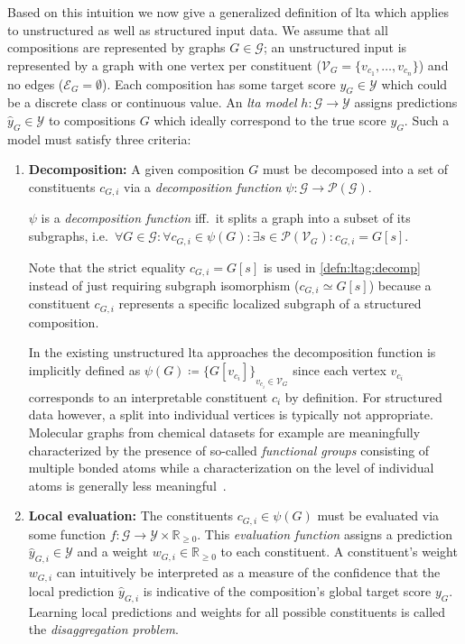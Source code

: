 Based on this intuition we now give a generalized definition of \ac{lta} which applies to unstructured as well as structured input data.
We assume that all compositions are represented by graphs $G \in \mathcal{G}$;
an unstructured input is represented by a graph with one vertex per constituent ($\mathcal{V}_G = \{ v_{c_1}, \dots, v_{c_n} \}$) and no edges ($\mathcal{E}_G = \emptyset$).
Each composition has some target score $y_G \in \mathcal{Y}$ which could be a discrete class or continuous value.
An \textit{\ac{lta} model} $h: \mathcal{G} \to \mathcal{Y}$ assigns predictions $\hat{y}_G \in \mathcal{Y}$ to compositions $G$ which ideally correspond to the true score $y_G$.
Such a model must satisfy three criteria:
\begin{enumerate}[label=\textbf{\arabic*.}]
	\item \textbf{Decomposition:}
		A given composition $G$ must be decomposed into a set of constituents $c_{G,i}$ via a \textit{decomposition function} $\psi: \mathcal{G} \to \mathcal{P}(\mathcal{G})$.
		\begin{defn}\label{defn:ltag:decomp}
			$\psi$ is a \textit{decomposition function} iff.\ it splits a graph into a subset of its subgraphs, i.e.\ $\forall G \in \mathcal{G}: \forall c_{G,i} \in \psi(G): \exists s \in \mathcal{P}(\mathcal{V}_G): c_{G,i} = G[s]$.
		\end{defn}
		Note that the strict equality $c_{G,i} = G[s]$ is used in \cref{defn:ltag:decomp} instead of just requiring subgraph isomorphism ($c_{G,i} \simeq G[s]$) because a constituent $c_{G,i}$ represents a specific localized subgraph of a structured composition.

		In the existing unstructured \ac{lta} approaches the decomposition function is implicitly defined as $\psi(G) \coloneqq {\{ G[v_{c_i}] \}}_{v_{c_i} \in \mathcal{V}_G}$ since each vertex $v_{c_i}$ corresponds to an interpretable constituent $c_i$ by definition.
		For structured data however, a split into individual vertices is typically not appropriate.
		Molecular graphs from chemical datasets for example are meaningfully characterized by the presence of so-called \textit{functional groups} consisting of multiple bonded atoms while a characterization on the level of individual atoms is generally less meaningful~\cite{McNaught1997}.
	\item \textbf{Local evaluation:}
		The constituents $c_{G, i} \in \psi(G)$ must be evaluated via some function $f: \mathcal{G} \to \mathcal{Y} \times \mathbb{R}_{\geq 0}$.
		This \textit{evaluation function} assigns a prediction $\hat{y}_{G, i} \in \mathcal{Y}$ and a weight $w_{G, i} \in \mathbb{R}_{\geq 0}$ to each constituent.
		A constituent's weight $w_{G, i}$ can intuitively be interpreted as a measure of the confidence that the local prediction $\hat{y}_{G, i}$ is indicative of the composition's global target score $y_G$.
		Learning local predictions and weights for all possible constituents is called the \textit{disaggregation problem}.


\end{enumerate}
